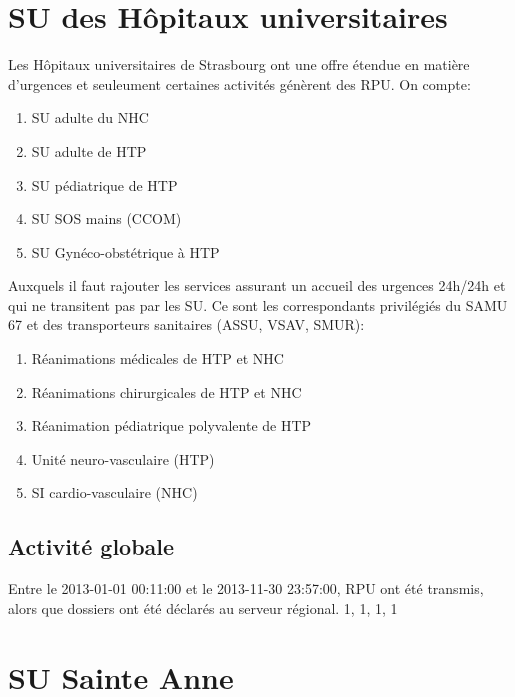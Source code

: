 \documentclass[12pt,english,french,twoside]{report}\usepackage[]{graphicx}\usepackage[]{color}
\begin{document}
\chapter{SU des Hôpitaux universitaires}



Les Hôpitaux universitaires de Strasbourg ont une offre étendue en matière d'urgences et seuleument certaines activités génèrent des RPU.
On compte:
\begin{enumerate}
  \item SU adulte du NHC
  \item SU adulte de HTP
  \item SU pédiatrique de HTP
  \item SU SOS mains (CCOM)
  \item SU Gynéco-obstétrique à HTP
\end{enumerate}
Auxquels il faut rajouter les services assurant un accueil des urgences 24h/24h et qui ne transitent pas par les SU. Ce sont les correspondants privilégiés du SAMU 67 et des transporteurs sanitaires (ASSU, VSAV, SMUR):
\begin{enumerate}
  \item Réanimations médicales de HTP et NHC
  \item Réanimations chirurgicales de HTP et NHC
  \item Réanimation pédiatrique polyvalente de HTP
  \item Unité neuro-vasculaire (HTP)
  \item SI cardio-vasculaire (NHC)
\end{enumerate}

\section{Activité globale}




Entre le 2013-01-01 00:11:00 et le 2013-11-30 23:57:00,  RPU ont été transmis, alors que  dossiers ont été déclarés au serveur régional. 
1, 1, 1, 1



\chapter{SU Sainte Anne}

\end{document}
